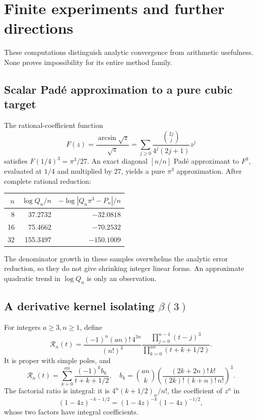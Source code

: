 \section{Finite experiments and further directions}
\label{app:experiments}

These computations distinguish analytic convergence from arithmetic
usefulness. None proves impossibility for its entire method family.

\subsection{Scalar Pad\'e approximation to a pure cubic target}

The rational-coefficient function
\[
F(z)=\frac{\arcsin\sqrt z}{\sqrt z}
=\sum_{j\ge0}\frac{\binom{2j}{j}}{4^j(2j+1)}z^j
\]
satisfies \(F(1/4)^3=\pi^3/27\).
An exact diagonal \([n/n]\) Pad\'e approximant to \(F^3\), evaluated
at \(1/4\) and multiplied by \(27\), yields a pure \(\pi^3\)
approximation. After complete rational reduction:
\begin{center}
\begin{tabular}{rrr}
\toprule
\(n\)&\(\log Q_n/n\)&\(-\log|Q_n\pi^3-P_n|/n\)\\
\midrule
8&37.2732&\(-32.0818\)\\
16&75.4662&\(-70.2532\)\\
32&155.3497&\(-150.1009\)\\
\bottomrule
\end{tabular}
\end{center}
The denominator growth in these samples overwhelms the analytic
error reduction, so they do not give shrinking integer linear forms.
An approximate quadratic trend in \(\log Q_n\) is only an observation.

\subsection{A derivative kernel isolating \texorpdfstring{\(\beta(3)\)}{beta(3)}}

For integers \(a\ge3,n\ge1\), define
\[
\mathcal R_n(t)=
\frac{(-1)^n(an)!\,4^{3n}}{(n!)^3}
\frac{\prod_{j=0}^{n-1}(t-j)^3}
 {\prod_{k=0}^{an}(t+k+1/2)}.
\]
It is proper with simple poles, and
\[
\mathcal R_n(t)=\sum_{k=0}^{an}\frac{(-1)^k b_k}{t+k+1/2},
\quad
b_k=\binom{an}{k}
\left(\frac{(2k+2n)!\,k!}{(2k)!\,(k+n)!\,n!}\right)^3.
\]
The factorial ratio is integral: it is
\(4^n(k+1/2)_n/n!\), the coefficient of \(z^n\) in
\[
(1-4z)^{-k-1/2}=(1-4z)^{-k}(1-4z)^{-1/2},
\]
whose two factors have integral coefficients.


